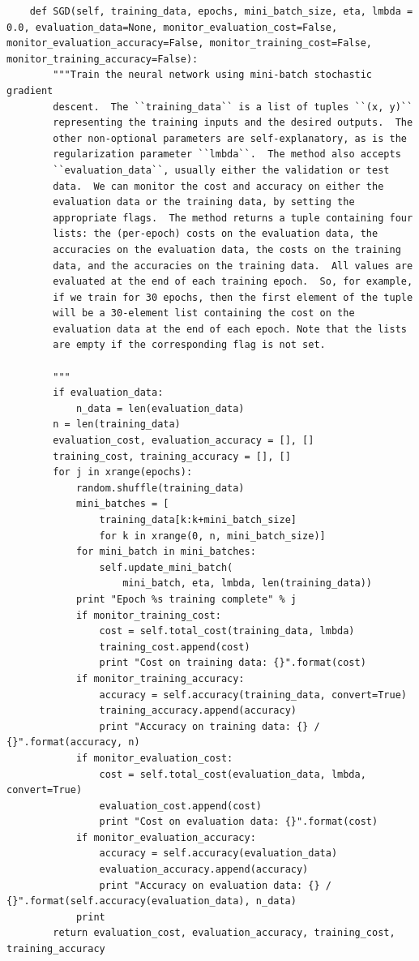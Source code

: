 \documentclass[a4paper,twoside,10pt]{book}
\begin{document}
\begin{lstlisting}
	def SGD(self, training_data, epochs, mini_batch_size, eta, lmbda = 0.0, evaluation_data=None, monitor_evaluation_cost=False, monitor_evaluation_accuracy=False, monitor_training_cost=False, monitor_training_accuracy=False):
		"""Train the neural network using mini-batch stochastic gradient
		descent.  The ``training_data`` is a list of tuples ``(x, y)``
		representing the training inputs and the desired outputs.  The
		other non-optional parameters are self-explanatory, as is the
		regularization parameter ``lmbda``.  The method also accepts
		``evaluation_data``, usually either the validation or test
		data.  We can monitor the cost and accuracy on either the
		evaluation data or the training data, by setting the
		appropriate flags.  The method returns a tuple containing four
		lists: the (per-epoch) costs on the evaluation data, the
		accuracies on the evaluation data, the costs on the training
		data, and the accuracies on the training data.  All values are
		evaluated at the end of each training epoch.  So, for example,
		if we train for 30 epochs, then the first element of the tuple
		will be a 30-element list containing the cost on the
		evaluation data at the end of each epoch. Note that the lists
		are empty if the corresponding flag is not set.
		
		"""
		if evaluation_data:
			n_data = len(evaluation_data)
		n = len(training_data)
		evaluation_cost, evaluation_accuracy = [], []
		training_cost, training_accuracy = [], []
		for j in xrange(epochs):
			random.shuffle(training_data)
			mini_batches = [
				training_data[k:k+mini_batch_size]
				for k in xrange(0, n, mini_batch_size)]
			for mini_batch in mini_batches:
				self.update_mini_batch(
					mini_batch, eta, lmbda, len(training_data))
			print "Epoch %s training complete" % j
			if monitor_training_cost:
				cost = self.total_cost(training_data, lmbda)
				training_cost.append(cost)
				print "Cost on training data: {}".format(cost)
			if monitor_training_accuracy:
				accuracy = self.accuracy(training_data, convert=True)
				training_accuracy.append(accuracy)
				print "Accuracy on training data: {} / {}".format(accuracy, n)
			if monitor_evaluation_cost:
				cost = self.total_cost(evaluation_data, lmbda, convert=True)
				evaluation_cost.append(cost)
				print "Cost on evaluation data: {}".format(cost)
			if monitor_evaluation_accuracy:
				accuracy = self.accuracy(evaluation_data)
				evaluation_accuracy.append(accuracy)
				print "Accuracy on evaluation data: {} / {}".format(self.accuracy(evaluation_data), n_data)
			print
		return evaluation_cost, evaluation_accuracy, training_cost, training_accuracy


\end{lstlisting}
\end{document}
